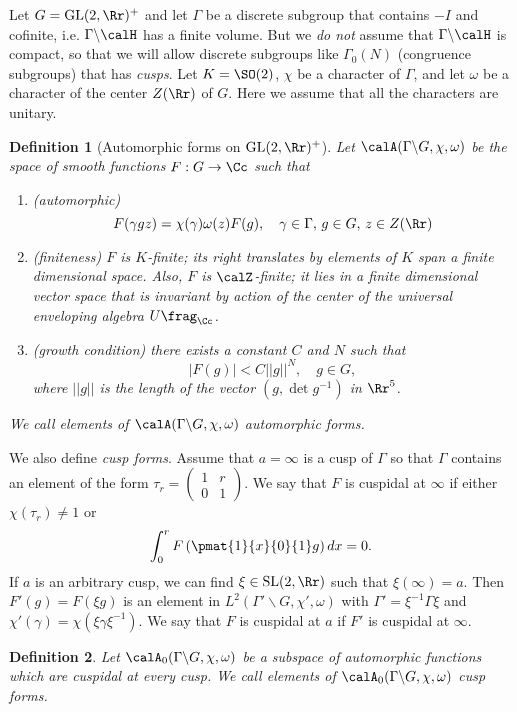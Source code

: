 \documentclass{article}
\newtheorem{definition}{Definition}[section]
\newcommand{\GL}{\mathrm{GL}}
\newcommand{\SL}{\mathrm{SL}}
\newcommand{\smat}[4]{\left(\begin{smallmatrix} #1 & #2 \\ #3 & #4 \end{smallmatrix}\right)}
\begin{document}
Let $G = \GL(2, \Rr)^{+}$ and let $\Gamma$ be a discrete subgroup that contains $-I$ and cofinite, i.e. $\Gamma\backslash \calH$ has a finite volume. But we \emph{do not} assume that $\Gamma\backslash \calH$ is compact, so that we will allow discrete subgroups like $\Gamma_{0}(N)$ (congruence subgroups) that has \emph{cusps}. Let $K = \SO(2)$, $\chi$ be a character of $\Gamma$, and let $\omega$ be a character of the center $Z(\Rr)$ of $G$. 
Here we assume that all the characters are unitary. 



\begin{definition}[Automorphic forms on $\GL(2, \Rr)^{+}$]
Let $\calA(\Gamma\backslash G, \chi, \omega)$ be the space of smooth functions $F:G\to \Cc$ such that 
\begin{enumerate}
\item (automorphic) $$F(\gamma gz) = \chi(\gamma)\omega(z)F(g), \quad \gamma\in \Gamma, \, g\in G, \, z\in Z(\Rr)$$
\item (finiteness) $F$ is $K$-finite; its right translates by elements of $K$ span a finite dimensional space. Also, $F$ is $\calZ$-finite; it lies in a finite dimensional vector space that is invariant by action of the center of the universal enveloping algebra $U\frag_{\Cc}$.  
\item (growth condition) there exists a constant $C$ and $N$ such that $$|F(g)|  < C||g||^{N}, \quad g\in G,$$where $||g||$ is the length of the vector $(g, \det g^{-1})$ in $\Rr^{5}$. 
\end{enumerate}
We call elements of $\calA(\Gamma\backslash G, \chi, \omega)$ automorphic forms. 
\end{definition}

We also define \emph{cusp forms}. Assume that $a = \infty$ is a cusp of $\Gamma$ so that $\Gamma$ contains an element of the form $\tau_{r} = \smat{1}{r}{0}{1}$. We say that $F$ is cuspidal at $\infty$ if either $\chi(\tau_{r})\neq 1$ or 
$$
\int_{0}^{r} F\left( \pmat{1}{x}{0}{1}g \right) dx = 0. 
$$
If $a$ is an arbitrary cusp, we can find $\xi\in \SL(2, \Rr)$ such that $\xi(\infty) = a$. 
Then $F'(g) = F(\xi g)$ is an element in $L^{2}(\Gamma'\backslash G, \chi', \omega)$ with $\Gamma' = \xi^{-1}\Gamma\xi$ and $\chi'(\gamma) = \chi(\xi\gamma\xi^{-1})$. We say that $F$ is cuspidal at $a$ if $F'$ is cuspidal at $\infty$. 

\begin{definition}
Let $\calA_{0}(\Gamma\backslash G, \chi, \omega)$ be a subspace of automorphic functions which are cuspidal at every cusp. We call elements of $\calA_{0}(\Gamma\backslash G, \chi, \omega)$ cusp forms. 
\end{definition}
\end{document}
